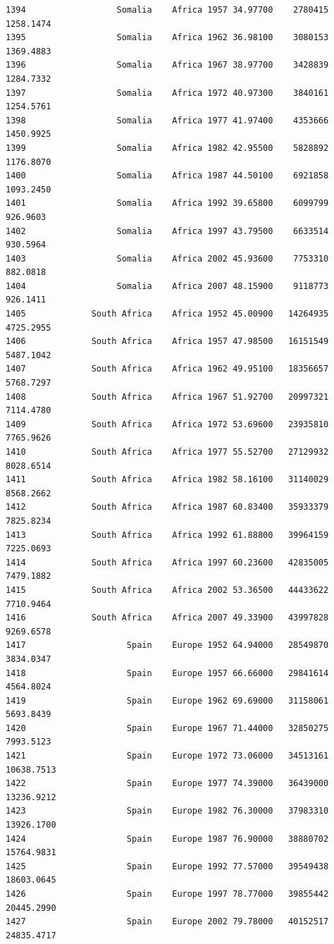 \documentclass[
  letterpaper,
  DIV=11,
  numbers=noendperiod]{scrreprt}
\begin{document}
\begin{verbatim}
1394                  Somalia    Africa 1957 34.97700    2780415   1258.1474
1395                  Somalia    Africa 1962 36.98100    3080153   1369.4883
1396                  Somalia    Africa 1967 38.97700    3428839   1284.7332
1397                  Somalia    Africa 1972 40.97300    3840161   1254.5761
1398                  Somalia    Africa 1977 41.97400    4353666   1450.9925
1399                  Somalia    Africa 1982 42.95500    5828892   1176.8070
1400                  Somalia    Africa 1987 44.50100    6921858   1093.2450
1401                  Somalia    Africa 1992 39.65800    6099799    926.9603
1402                  Somalia    Africa 1997 43.79500    6633514    930.5964
1403                  Somalia    Africa 2002 45.93600    7753310    882.0818
1404                  Somalia    Africa 2007 48.15900    9118773    926.1411
1405             South Africa    Africa 1952 45.00900   14264935   4725.2955
1406             South Africa    Africa 1957 47.98500   16151549   5487.1042
1407             South Africa    Africa 1962 49.95100   18356657   5768.7297
1408             South Africa    Africa 1967 51.92700   20997321   7114.4780
1409             South Africa    Africa 1972 53.69600   23935810   7765.9626
1410             South Africa    Africa 1977 55.52700   27129932   8028.6514
1411             South Africa    Africa 1982 58.16100   31140029   8568.2662
1412             South Africa    Africa 1987 60.83400   35933379   7825.8234
1413             South Africa    Africa 1992 61.88800   39964159   7225.0693
1414             South Africa    Africa 1997 60.23600   42835005   7479.1882
1415             South Africa    Africa 2002 53.36500   44433622   7710.9464
1416             South Africa    Africa 2007 49.33900   43997828   9269.6578
1417                    Spain    Europe 1952 64.94000   28549870   3834.0347
1418                    Spain    Europe 1957 66.66000   29841614   4564.8024
1419                    Spain    Europe 1962 69.69000   31158061   5693.8439
1420                    Spain    Europe 1967 71.44000   32850275   7993.5123
1421                    Spain    Europe 1972 73.06000   34513161  10638.7513
1422                    Spain    Europe 1977 74.39000   36439000  13236.9212
1423                    Spain    Europe 1982 76.30000   37983310  13926.1700
1424                    Spain    Europe 1987 76.90000   38880702  15764.9831
1425                    Spain    Europe 1992 77.57000   39549438  18603.0645
1426                    Spain    Europe 1997 78.77000   39855442  20445.2990
1427                    Spain    Europe 2002 79.78000   40152517  24835.4717

\end{verbatim}
\end{document}
